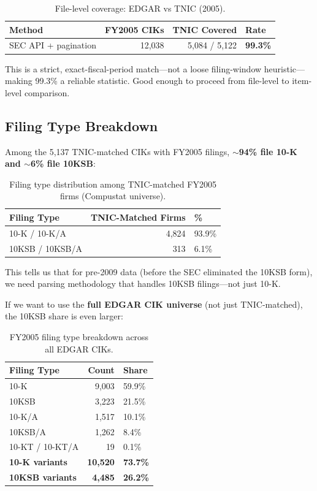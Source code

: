 \documentclass[11pt]{article}
\begin{document}
\begin{table}[h]
\centering
\begin{tabular}{lrrl}
\toprule
Method & FY2005 CIKs & TNIC Covered & Rate \\
\midrule
SEC API + pagination & 12,038 & 5,084 / 5,122 & \textbf{99.3\%} \\
\bottomrule
\end{tabular}
\caption{File-level coverage: EDGAR vs TNIC (2005).}
\end{table}

This is a strict, exact-fiscal-period match---not a loose filing-window
heuristic---making 99.3\% a reliable statistic. Good enough to proceed from
file-level to item-level comparison.

\subsection{Filing Type Breakdown}

Among the 5,137 TNIC-matched CIKs with FY2005 filings, \textbf{$\sim$94\% file
10-K and $\sim$6\% file 10KSB}:

\begin{table}[h]
\centering
\begin{tabular}{lrl}
\toprule
Filing Type & TNIC-Matched Firms & \% \\
\midrule
10-K / 10-K/A   & 4,824 & 93.9\% \\
10KSB / 10KSB/A & 313   & 6.1\%  \\
\bottomrule
\end{tabular}
\caption{Filing type distribution among TNIC-matched FY2005 firms (Compustat universe).}
\end{table}

This tells us that for pre-2009 data (before the SEC eliminated the 10KSB form),
we need parsing methodology that handles 10KSB filings---not just 10-K.

If we want to use the \textbf{full EDGAR CIK universe} (not just TNIC-matched),
the 10KSB share is even larger:

\begin{table}[h]
\centering
\begin{tabular}{lrl}
\toprule
Filing Type & Count & Share \\
\midrule
10-K      & 9,003 & 59.9\% \\
10KSB     & 3,223 & 21.5\% \\
10-K/A    & 1,517 & 10.1\% \\
10KSB/A   & 1,262 & 8.4\% \\
10-KT / 10-KT/A & 19 & 0.1\% \\
\midrule
\textbf{10-K variants} & \textbf{10,520} & \textbf{73.7\%} \\
\textbf{10KSB variants} & \textbf{4,485} & \textbf{26.2\%} \\
\bottomrule
\end{tabular}
\caption{FY2005 filing type breakdown across all EDGAR CIKs.}
\end{table}
\end{document}
